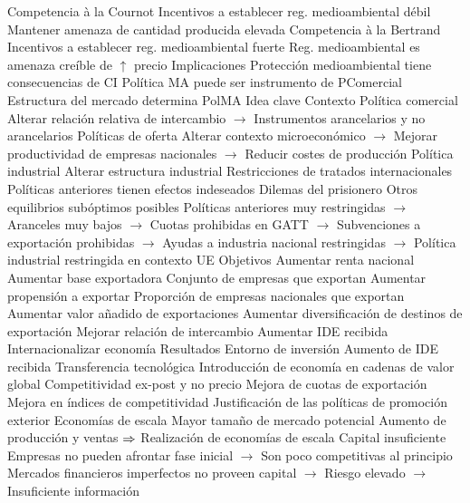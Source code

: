 \documentclass{nuevotema}
\begin{document}
\begin{esquemal}
				\4 Competencia à la Cournot
				\4[] Incentivos a establecer reg. medioambiental débil
				\4[] Mantener amenaza de cantidad producida elevada
				\4 Competencia à la Bertrand
				\4[] Incentivos a establecer reg. medioambiental fuerte
				\4[] Reg. medioambiental es amenaza creíble de $\uparrow$ precio
			\3 Implicaciones
				\4 Protección medioambiental tiene consecuencias de CI
				\4 Política MA puede ser instrumento de PComercial
				\4 Estructura del mercado determina PolMA
	\1 
		\2 Idea clave
			\3 Contexto
				\4 Política comercial
				\4[] Alterar relación relativa de intercambio
				\4[] $\to$ Instrumentos arancelarios y no arancelarios
				\4 Políticas de oferta
				\4[] Alterar contexto microeconómico
				\4[] $\to$ Mejorar productividad de empresas nacionales
				\4[] $\to$ Reducir costes de producción
				\4 Política industrial
				\4[] Alterar estructura industrial
				\4 Restricciones de tratados internacionales
				\4[] Políticas anteriores tienen efectos indeseados
				\4[] Dilemas del prisionero
				\4[] Otros equilibrios subóptimos posibles
				\4[] Políticas anteriores muy restringidas
				\4[] $\to$ Aranceles muy bajos
				\4[] $\to$ Cuotas prohibidas en GATT
				\4[] $\to$ Subvenciones a exportación prohibidas
				\4[] $\to$ Ayudas a industria nacional restringidas
				\4[] $\to$ Política industrial restringida en contexto UE
			\3 Objetivos
				\4 Aumentar renta nacional
				\4 Aumentar base exportadora
				\4[] Conjunto de empresas que exportan
				\4 Aumentar propensión a exportar
				\4[] Proporción de empresas nacionales que exportan
				\4 Aumentar valor añadido de exportaciones
				\4 Aumentar diversificación de destinos de exportación
				\4 Mejorar relación de intercambio
				\4 Aumentar IDE recibida
				\4[$\then$] Internacionalizar economía
			\3 Resultados
				\4 Entorno de inversión
				\4[] Aumento de IDE recibida
				\4[] Transferencia tecnológica
				\4[] Introducción de economía en cadenas de valor global
				\4 Competitividad ex-post y no precio
				\4[] Mejora de cuotas de exportación
				\4[] Mejora en índices de competitividad
		\2 Justificación de las políticas de promoción exterior
			\3 Economías de escala
				\4 Mayor tamaño de mercado potencial
				\4[] Aumento de producción y ventas
				\4[] $\then$ Realización de economías de escala
				\4 Capital insuficiente
				\4[] Empresas no pueden afrontar fase inicial
				\4[] $\to$ Son poco competitivas al principio
				\4[] Mercados financieros imperfectos no proveen capital
				\4[] $\to$ Riesgo elevado
				\4[] $\to$ Insuficiente información

\end{esquemal}
\end{document}
